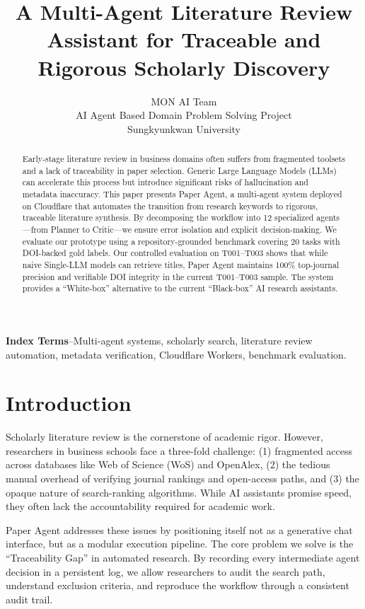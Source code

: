 \documentclass[10pt,twocolumn]{article}
\title{A Multi-Agent Literature Review Assistant for Traceable and Rigorous Scholarly Discovery}
\author{MON AI Team\\AI Agent Based Domain Problem Solving Project\\Sungkyunkwan University}
\date{}
\begin{document}
\maketitle

\begin{abstract}
Early-stage literature review in business domains often suffers from fragmented toolsets and a lack of traceability in paper selection. Generic Large Language Models (LLMs) can accelerate this process but introduce significant risks of hallucination and metadata inaccuracy. This paper presents Paper Agent, a multi-agent system deployed on Cloudflare that automates the transition from research keywords to rigorous, traceable literature synthesis. By decomposing the workflow into 12 specialized agents---from Planner to Critic---we ensure error isolation and explicit decision-making. We evaluate our prototype using a repository-grounded benchmark covering 20 tasks with DOI-backed gold labels. Our controlled evaluation on T001--T003 shows that while naive Single-LLM models can retrieve titles, Paper Agent maintains 100\% top-journal precision and verifiable DOI integrity in the current T001--T003 sample. The system provides a ``White-box'' alternative to the current ``Black-box'' AI research assistants.
\end{abstract}


\noindent\textbf{Index Terms}--Multi-agent systems, scholarly search, literature review automation, metadata verification, Cloudflare Workers, benchmark evaluation.


\section{Introduction}

Scholarly literature review is the cornerstone of academic rigor. However, researchers in business schools face a three-fold challenge: (1) fragmented access across databases like Web of Science (WoS) and OpenAlex, (2) the tedious manual overhead of verifying journal rankings and open-access paths, and (3) the opaque nature of search-ranking algorithms. While AI assistants promise speed, they often lack the accountability required for academic work.

Paper Agent addresses these issues by positioning itself not as a generative chat interface, but as a modular execution pipeline. The core problem we solve is the ``Traceability Gap'' in automated research. By recording every intermediate agent decision in a persistent log, we allow researchers to audit the search path, understand exclusion criteria, and reproduce the workflow through a consistent audit trail.
\end{document}
